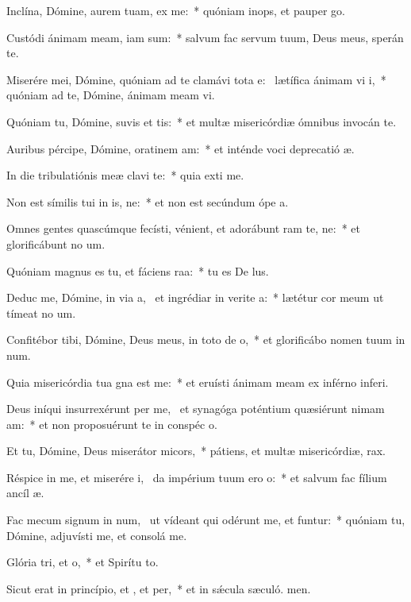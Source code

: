 \item Inclína, Dómine, aurem tuam,  ex me:~* quóniam inops, et pauper  go.
\item Custódi ánimam meam, iam  sum:~* salvum fac servum tuum, Deus meus, sperán  te.
\item Miserére mei, Dómine, quóniam ad te clamávi tota e:~\pscross{} lætífica ánimam vi i,~* quóniam ad te, Dómine, ánimam meam vi.
\item Quóniam tu, Dómine, suvis et tis:~* et multæ misericórdiæ ómnibus invocán te.
\item Auribus pércipe, Dómine, oratinem am:~* et inténde voci deprecatió æ.
\item In die tribulatiónis meæ clavi  te:~* quia exti me.
\item Non est símilis tui in is, ne:~* et non est secúndum ópe a.
\item Omnes gentes quascúmque fecísti, vénient, et adorábunt ram te, ne:~* et glorificábunt no um.
\item Quóniam magnus es tu, et fáciens raa:~* tu es De lus.
\item Deduc me, Dómine, in via a,~\pscross{} et ingrédiar in verite a:~* lætétur cor meum ut tímeat no um.
\item Confitébor tibi, Dómine, Deus meus, in toto de o,~* et glorificábo nomen tuum in num.
\item Quia misericórdia tua gna est  me:~* et eruísti ánimam meam ex inférno inferi.
\item Deus iníqui insurrexérunt per me,~\pscross{} et synagóga poténtium quæsiérunt nimam am:~* et non proposuérunt te in conspéc o.
\item Et tu, Dómine, Deus miserátor  micors,~* pátiens, et multæ misericórdiæ,  rax.
\item Réspice in me, et miserére i,~\pscross{} da impérium tuum ero o:~* et salvum fac fílium ancíl æ.
\item Fac mecum signum in num,~\pscross{} ut vídeant qui odérunt me, et funtur:~* quóniam tu, Dómine, adjuvísti me, et consolá  me.
\item Glória tri, et o,~* et Spirítu to.
\item Sicut erat in princípio, et , et per,~* et in sǽcula sæculó. men.
